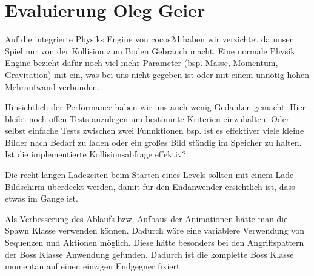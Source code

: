 \chapter[Evaluierung]{Evaluierung \small Oleg Geier}\label{ch:eval}

Auf die integrierte Physiks Engine von cocos2d haben wir verzichtet da unser Spiel nur von der Kollision zum Boden Gebrauch macht. Eine normale Physik Engine bezieht dafür noch viel mehr Parameter (bsp. Masse, Momentum, Gravitation) mit ein, was bei uns nicht gegeben ist oder mit einem unnötig hohen Mehraufwand verbunden.

Hinsichtlich der Performance haben wir uns auch wenig Gedanken gemacht. Hier bleibt noch offen Tests anzulegen um bestimmte Kriterien einzuhalten. Oder selbst einfache Tests zwischen zwei Funnktionen bsp. ist es effektiver viele kleine Bilder nach Bedarf zu laden oder ein großes Bild ständig im Speicher zu halten. Ist die implementierte Kollisionsabfrage effektiv?

Die recht langen Ladezeiten beim Starten eines Levels sollten mit einem Lade-Bildschirm überdeckt werden, damit für den Endanwender ersichtlich ist, dass etwas im Gange ist.

Als Verbesserung des Ablaufs bzw. Aufbaus der Animationen hätte man die Spawn Klasse verwenden können. Dadurch wäre eine variablere Verwendung von Sequenzen und Aktionen möglich. Diese hätte besonders bei den Angriffspattern der Boss Klasse Anwendung gefunden. Dadurch ist die komplette Boss Klasse momentan auf einen einzigen Endgegner fixiert.
